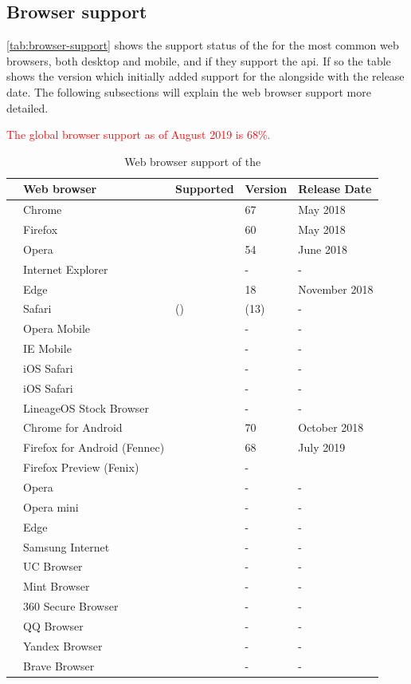 \subsection{Browser support}

\autoref{tab:browser-support} shows the support status of the \wa{} for the most common web browsers, both desktop and mobile, and if they support the \gls{api}. If so the table shows the version which initially added support for the \wa{} alongside with the release date. The following subsections will explain the web browser support more detailed.

\textcolor{red}{The global browser support as of August 2019 is 68\%.}
\begin{table}[ht]
	\begin{tabularx}{\textwidth}{l|p{5.3cm}|p{2cm}|p{1.9cm}|p{2.8cm}}
		& Web browser & Supported & Version & Release Date \\
		\hline
		\parbox[t]{2mm}{} & Chrome & \OK & 67 & May 2018 \\
		& Firefox & \OK & 60 & May 2018 \\
		& Opera & \OK & 54 & June 2018 \\
		& Internet Explorer & \NOOK & - & - \\
		& Edge & \OK & 18 & November 2018 \\
		& Safari & (\OK) & (13) & - \\
		\hline
		\parbox[t]{2mm}{} & Opera Mobile & \NOOK & - & - \\
		& IE Mobile & \NOOK & - & - \\
		& iOS Safari & \NOOK & - & - \\
		& iOS Safari & \NOOK & - & - \\
		\hline
		\parbox[t]{2mm}{} & LineageOS Stock Browser & \NOOK & - & - \\
		& Chrome for Android & \OK & 70 & October 2018 \\
		& Firefox for Android (Fennec) & \OK & 68 & July 2019 \\
		& Firefox Preview (Fenix) & \NOOK & - \\
		& Opera & \NOOK & - & - \\
		& Opera mini & \NOOK & - & - \\
		& Edge & \NOOK & - & - \\
		& Samsung Internet & \NOOK & - & - \\
		& UC Browser & \NOOK & - & - \\
		& Mint Browser & \NOOK & - & - \\
		& 360 Secure Browser & \NOOK & - & - \\
		& QQ Browser & \NOOK & - & - \\
		& Yandex Browser & \NOOK & - & - \\
		& Brave Browser & \NOOK & - & -
	\end{tabularx}
	\caption[Web browser support of the \wa]{Web browser support of the \wa\footnotemark}
	\label{tab:browser-support}
\end{table}

